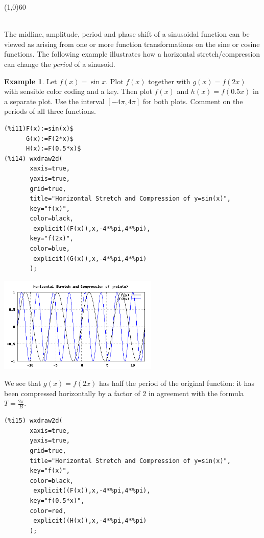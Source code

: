 \documentclass[10.5pt,twoside]{report}
\theoremstyle{definition}
\newtheorem{exmp}{Example}[section]
\begin{document}
\line(1,0){60}
\linethickness{0.5mm}

${}$\\

The midline, amplitude, period and phase shift of a sinusoidal function can be viewed as arising from one or more function transformations on the sine or cosine functions.  The following example illustrates how a horizontal stretch/compression can change the \textit{period} of a sinusoid.

\begin{exmp}
Let $f(x)=\sin{x}$.  Plot $f(x)$ together with $g(x)=f(2x)$ with sensible color coding and a key.  Then plot $f(x)$ and $h(x)=f(0.5x)$ in a separate plot. Use the interval ${[{-4\pi},4\pi]}$ for both plots.  Comment on the periods of all three functions.\\

\begin{verbatim}
(%i11)F(x):=sin(x)$
      G(x):=F(2*x)$
      H(x):=F(0.5*x)$
(%i14) wxdraw2d(
       xaxis=true,
       yaxis=true,
       grid=true,
       title="Horizontal Stretch and Compression of y=sin(x)",
       key="f(x)",
       color=black,
        explicit((F(x)),x,-4*%pi,4*%pi),
       key="f(2x)",
       color=blue,
        explicit((G(x)),x,-4*%pi,4*%pi)
       );
\end{verbatim}

\includegraphics[width=3in]{example_1_4_2_1}

We see that $g(x)=f(2x)$ has half the period of the original function:  it has been compressed horizontally by a factor of 2 in agreement with the formula $T=\frac{2\pi}{B}$.

\begin{verbatim}
(%i15) wxdraw2d(
       xaxis=true,
       yaxis=true,
       grid=true,
       title="Horizontal Stretch and Compression of y=sin(x)",
       key="f(x)",
       color=black,
        explicit((F(x)),x,-4*%pi,4*%pi),
       key="f(0.5*x)",
       color=red,
        explicit((H(x)),x,-4*%pi,4*%pi)
       );
\end{verbatim}


\end{exmp}
\end{document}

